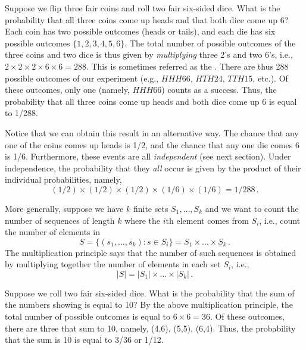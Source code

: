\begin{example}
    Suppose we flip three fair coins and roll two fair six-sided dice. What is the probability that all three coins
    come up heads and that both dice come up 6? Each coin has two possible outcomes (heads or tails), and each die
    has six  possible outcomes $\{1,2,3,4,5,6\}$. The total number of possible outcomes of the three coins and two
    dice is thus given by \emph{multiplying} three 2's and two 6's, i.e., $2\times2\times2\times6\times6=288$. This is
    sometimes referred as the . There are thus 288 possible outcomes of our experiment
    (e.g., $HHH66$, $HTH24$, $TTH15$, etc.). Of these outcomes, only one (namely, $HHH66$) counts as a success. Thus,
    the probability that all three coins come up heads and both dice come up 6 is equal to 1/288.

    Notice that we can obtain this result in an alternative way. The chance that any one of the coins comes up heads
    is 1/2, and the chance that any one die comes 6 is 1/6. Furthermore, these events are all \emph{independent} (see
    next section). Under independence, the probability that they \emph{all} occur is given by the product of their
    individual probabilities, namely,
    $$
    (1/2)\times(1/2)\times(1/2)\times(1/6)\times(1/6)=1/288\,.
    $$

    More generally, suppose we have $k$ finite sets $S_1,\dots,S_k$ and we want to count the number of sequences of
    length $k$ where the $i$th element comes from $S_i$, i.e., count the number of elements in
    $$
    S = \{(s_1,\dots,s_k) : s \in S_i\} = S_1 \times \dots \times S_k\,.
    $$
    The multiplication principle says that the number of such sequences is obtained by multiplying together the
    number of elements in each set $S_i$, i.e.,
    $$
    |S| = |S_1|\times\dots\times|S_k|\,.
    $$
\end{example}

\begin{example}
    Suppose we roll two fair six-sided dice. What is the probability that the sum of the numbers showing is equal to 10? By the above multiplication principle, the total number of possible outcomes is equal to $6\times6=36$. Of these outcomes, there are three that sum to 10, namely, (4,6), (5,5), (6,4). Thus, the probability that the sum is 10 is equal to 3/36 or 1/12.
\end{example}

